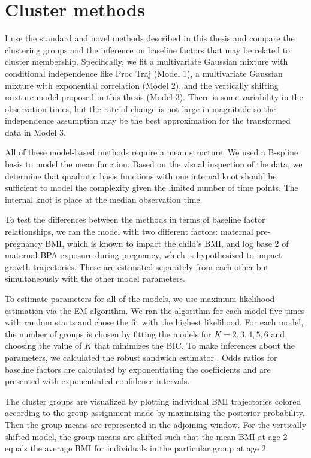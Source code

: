 \section{Cluster methods}
I use the standard and novel methods described in this thesis and compare the clustering groups and the inference on baseline factors that may be related to cluster membership. Specifically, we fit a multivariate Gaussian mixture with conditional independence like Proc Traj (Model 1), a multivariate Gaussian mixture with exponential correlation (Model 2), and the vertically shifting mixture model proposed in this thesis (Model 3). There is some variability in the observation times, but the rate of change is not large in magnitude so the independence assumption may be the best approximation for the transformed data in Model 3.

All of these model-based methods require a mean structure. We used a B-spline basis to model the mean function. Based on the visual inspection of the data, we determine that quadratic basis functions with one internal knot should be sufficient to model the complexity given the limited number of time points.  The internal knot is place at the median observation time. 

To test the differences between the methods in terms of baseline factor relationships, we ran the model with two different factors: maternal pre-pregnancy BMI, which is known to impact the child's BMI, and log base 2 of maternal BPA exposure during pregnancy, which is hypothesized to impact growth trajectories. These are estimated separately from each other but simultaneously with the other model parameters.

To estimate parameters for all of the models, we use maximum likelihood estimation via the EM algorithm. We ran the algorithm for each model five times with random starts and chose the fit with the highest likelihood. For each model, the number of groups is chosen by fitting the models for $K=2,3,4,5,6$ and choosing the value of $K$ that minimizes the BIC. To make inferences about the parameters, we calculated the robust sandwich estimator \cite{white1982}. Odds ratios for baseline factors are calculated by exponentiating the coefficients and are presented with exponentiated confidence intervals.

The cluster groups are visualized by plotting individual BMI trajectories colored according to the group assignment made by maximizing the posterior probability. Then the group means are represented in the adjoining window. For the vertically shifted model, the group means are shifted such that the mean BMI at age 2 equals the average BMI for individuals in the particular group at age 2. 


